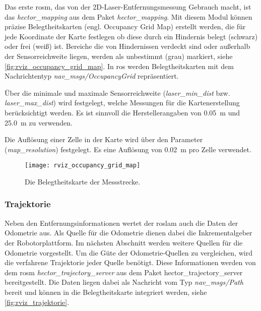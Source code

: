 Das erste \Gls{rosm}, das von der 2D-Laser-Entfernungsmessung Gebrauch macht, ist das \textit{hector\_mapping} aus dem Paket \textit{hector\_mapping}. Mit diesem Modul können präzise Belegtheitskarten (engl. Occupancy Grid Map) erstellt werden, die für jede Koordinate der Karte festlegen ob diese durch ein Hindernis belegt (schwarz) oder frei (weiß) ist. Bereiche die von Hindernissen verdeckt sind oder außerhalb der Sensorreichweite liegen, werden als unbestimmt (grau) markiert, siehe \autoref{fig:rviz_occupancy_grid_map}. In \Gls{ros} werden Belegtheitskarten mit dem Nachrichtentyp \textit{nav\_msgs/OccupancyGrid} repräsentiert.

Über die minimale und maximale Sensorreichweite (\textit{laser\_min\_dist} bzw. \textit{laser\_max\_dist}) wird festgelegt, welche Messungen für die Kartenerstellung berücksichtigt werden. Es ist sinnvoll die Herstellerangaben von \SI{0.05}{\meter} und \SI{25.0}{\meter} zu verwenden.

Die Auflösung einer Zelle in der Karte wird über den Parameter (\textit{map\_resolution}) festgelegt. Es eine Auflösung von \SI{0.02}{\meter} pro Zelle verwendet.

\begin{figure}
	\centering
	\texttt{[image: rviz\_occupancy\_grid\_map]}
	\caption{Die Belegtheitskarte der Messstrecke.}
	\label{fig:rviz_occupancy_grid_map}
\end{figure}
 

%
%
\subsubsection{Trajektorie}

Neben den Entfernungsinformationen wertet der \Gls{roslam} auch die Daten der Odometrie aus. Als Quelle für die Odometrie dienen dabei die Inkrementalgeber der Robotorplattform. Im nächsten Abschnitt werden weitere Quellen für die Odometrie vorgestellt. Um die Güte der Odometrie-Quellen zu vergleichen, wird die verfahrene Trajektorie jeder Quelle benötigt. Diese Informationen werden von dem \Gls{rosm} \textit{hector\_trajectory\_server} aus dem Paket {hector\_trajectory\_server} bereitgestellt. Die Daten liegen dabei als Nachricht vom Typ \textit{nav\_msgs/Path} bereit und können in die Belegtheitskarte integriert werden, siehe \autoref{fig:rviz_trajektorie}.

